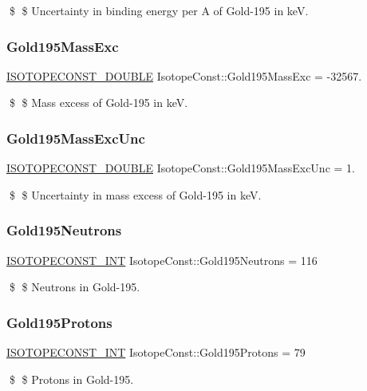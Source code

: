 \$ \$ Uncertainty in binding energy per A of Gold-\/195 in keV. \mbox{\label{group___isotope_const-_gold-_au195_gaf6492e1ca067c1ee30d6478543eb7cde}} 
\subsubsection{\texorpdfstring{Gold195\+Mass\+Exc}{Gold195MassExc}}
{\footnotesize\ttfamily \mbox{\hyperlink{group___isotope_const-_macros_ga8f45a7272ce02c0b4c65c44636ed719a}{I\+S\+O\+T\+O\+P\+E\+C\+O\+N\+S\+T\+\_\+\+D\+O\+U\+B\+LE}} Isotope\+Const\+::\+Gold195\+Mass\+Exc = -\/32567.}

\$ \$ Mass excess of Gold-\/195 in keV. \mbox{\label{group___isotope_const-_gold-_au195_ga8dbb9630b5cbdb68ea1724d98d910b51}} 
\subsubsection{\texorpdfstring{Gold195\+Mass\+Exc\+Unc}{Gold195MassExcUnc}}
{\footnotesize\ttfamily \mbox{\hyperlink{group___isotope_const-_macros_ga8f45a7272ce02c0b4c65c44636ed719a}{I\+S\+O\+T\+O\+P\+E\+C\+O\+N\+S\+T\+\_\+\+D\+O\+U\+B\+LE}} Isotope\+Const\+::\+Gold195\+Mass\+Exc\+Unc = 1.}

\$ \$ Uncertainty in mass excess of Gold-\/195 in keV. \mbox{\label{group___isotope_const-_gold-_au195_gad74eb410c745e78e269ea6f41a11f680}} 
\subsubsection{\texorpdfstring{Gold195\+Neutrons}{Gold195Neutrons}}
{\footnotesize\ttfamily \mbox{\hyperlink{group___isotope_const-_macros_ga5f18360b3e99483a35c32d789e62621c}{I\+S\+O\+T\+O\+P\+E\+C\+O\+N\+S\+T\+\_\+\+I\+NT}} Isotope\+Const\+::\+Gold195\+Neutrons = 116}

\$ \$ Neutrons in Gold-\/195. \mbox{\label{group___isotope_const-_gold-_au195_gaf28cce408a40b792846557dc3712f38e}} 
\subsubsection{\texorpdfstring{Gold195\+Protons}{Gold195Protons}}
{\footnotesize\ttfamily \mbox{\hyperlink{group___isotope_const-_macros_ga5f18360b3e99483a35c32d789e62621c}{I\+S\+O\+T\+O\+P\+E\+C\+O\+N\+S\+T\+\_\+\+I\+NT}} Isotope\+Const\+::\+Gold195\+Protons = 79}

\$ \$ Protons in Gold-\/195. 